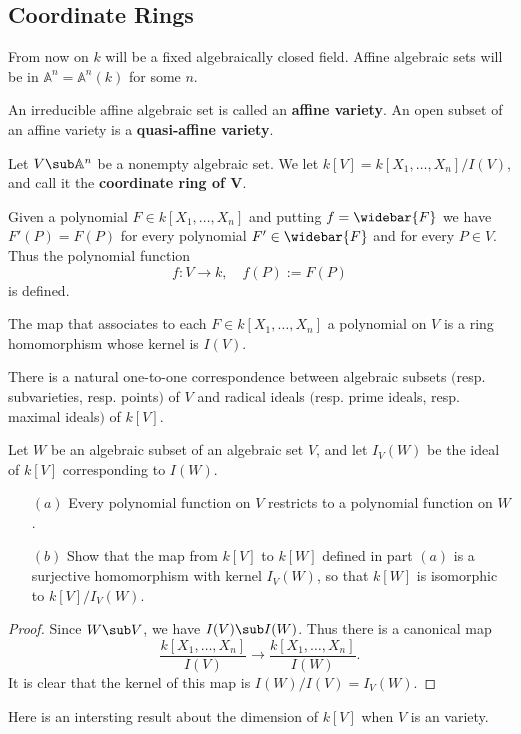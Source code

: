 \subsection{Coordinate Rings}
From now on $k$ will be a fixed algebraically closed field. Affine algebraic sets will be in $\mathbb{A}^n=\mathbb{A}^n(k)$ for some $n$. 
\begin{definition}
An irreducible affine algebraic set is called an \textbf{affine variety}. An open subset of an affine variety is a \textbf{quasi-affine variety}.
\end{definition}
Let $V\sub\mathbb{A}^n$ be a nonempty algebraic set. We let $k[V]=k[X_1,\dots,X_n]/I(V)$, and call it the \textbf{coordinate ring of $\bm{V}$}.\par
Given a polynomial $F\in k[X_1,\dots,X_n]$ and putting $f=\widebar{F}$ we have $F'(P)=F(P)$ for every polynomial $F'\in\widebar{F}$ and for every $P\in V$. Thus the polynomial function 
\[f:V\to k,\quad f(P):=F(P)\]
is defined.
\begin{proposition}
The map that associates to each $F\in k[X_1,\dots,X_n]$ a polynomial on $V$ is a ring homomorphism whose kernel is $I(V)$.
\end{proposition}
\begin{proposition}
There is a natural one-to-one correspondence between algebraic subsets $($resp. subvarieties, resp. points$)$ of $V$ and radical ideals $($resp. prime ideals, resp. maximal ideals$)$ of $k[V]$.
\end{proposition}
\begin{proposition}
Let $W$ be an algebraic subset of an algebraic set $V$, and let $I_V(W)$ be the ideal of $k[V]$ corresponding to $I(W)$.
\begin{itemize}
\item[$(a)$] Every polynomial function on $V$ restricts to a polynomial
function on $W$.
\item[$(b)$] Show that the map from $k[V]$ to $k[W]$ defined in part $(a)$ is a surjective homomorphism with kernel $I_V(W)$, so that $k[W]$ is isomorphic to $k[V]/I_V(W)$.
\end{itemize}
\end{proposition}
\begin{proof}
Since $W\sub V$, we have $I(V)\sub I(W)$. Thus there is a canonical map \[\frac{k[X_1,\dots,X_n]}{I(V)}\to\frac{k[X_1,\dots,X_n]}{I(W)}.\]
It is clear that the kernel of this map is $I(W)/I(V)=I_V(W)$.
\end{proof}
Here is an intersting result about the dimension of $k[V]$ when $V$ is an variety.
